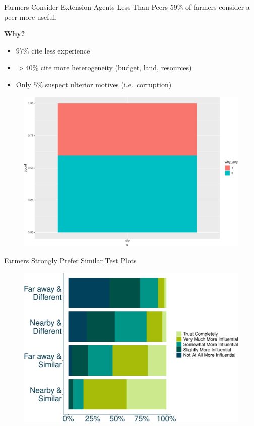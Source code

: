 \documentclass[
  ignorenonframetext,
]{beamer}
\providecommand{\tightlist}{%
  \setlength{\itemsep}{0pt}\setlength{\parskip}{0pt}}\usepackage{longtable,booktabs,array}
\begin{document}
\begin{frame}{Farmers Consider Extension Agents Less Than Peers}
\protect\hypertarget{farmers-consider-extension-agents-less-than-peers}{}
59\% of farmers consider a peer more useful.

\textbf{Why?}

\begin{itemize}[<+->]
\tightlist
\item
  \(97\%\) cite less experience
\item
  \(> 40\%\) cite more heterogeneity (budget, land, resources)
\item
  Only \(5\%\) suspect ulterior motives (i.e.~corruption)
\end{itemize}

\begin{figure}

{\centering \includegraphics{presentation_lori_files/figure-beamer/unnamed-chunk-7-1.pdf}

}

\end{figure}

\begin{frame}{Farmers Strongly Prefer Similar Test Plots}
\protect\hypertarget{farmers-strongly-prefer-similar-test-plots}{}
\begin{figure}

{\centering \includegraphics{presentation_lori_files/figure-beamer/unnamed-chunk-8-1.pdf}

}
\end{figure}
\end{frame}
\end{frame}
\end{document}
